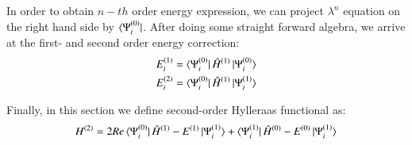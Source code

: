 \documentclass[journal=jacsat]{achemso}
\numberwithin{equation}{section}
\begin{document}
In order to obtain $n-th$ order energy expression, we can project $\lambda^{n}$ equation on the right hand side by $\bra{\Psi_{i}^{(0)}}$. After doing some straight forward algebra, we arrive at the first- and second order energy correction:
 \begin{align}
E_{i}^{(1)}&=\bra{\Psi_{i}^{(0)}}\hat{H}^{(1)}\ket{\Psi_{i}^{(0)}}\\
E_{i}^{(2)}&=\bra{\Psi_{i}^{(0)}}\hat{H}^{(1)}\ket{\Psi_{i}^{(1)}}
\end{align}

Finally, in this section we define second-order Hylleraas functional as:
 \begin{align}
H^{(2)}=2Re\bra{\Psi_{i}^{(0)}}\hat{H}^{(1)}-E^{(1)}\ket{\Psi_{i}^{(1)}}+\bra{\Psi_{i}^{(1)}}\hat{H}^{(0)}-E^{(0)}\ket{\Psi_{i}^{(1)}}
\end{align} 
\end{document}

